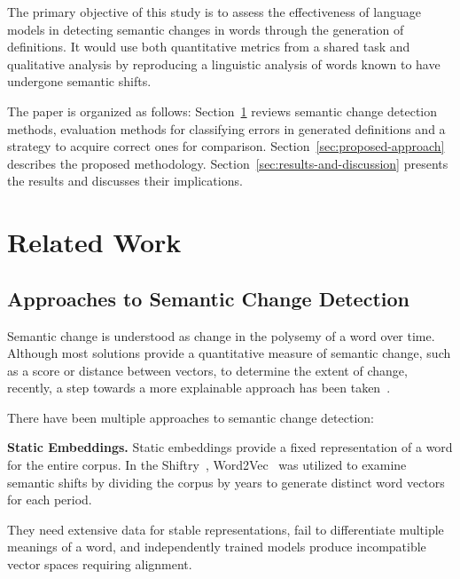 \documentclass[11pt]{article}
\begin{document}
The primary objective of this study is to assess the effectiveness of language models in detecting semantic changes in words through the generation of definitions.
It would use both quantitative metrics from a shared task and qualitative analysis by reproducing a linguistic analysis of words known to have undergone semantic shifts.

The paper is organized as follows:
Section~\ref{sec:related-work} reviews semantic change detection methods, evaluation methods for classifying errors in generated definitions and a strategy to acquire correct ones for comparison.
Section~\ref{sec:proposed-approach} describes the proposed methodology.
Section~\ref{sec:results-and-discussion} presents the results and discusses their implications.

\section{Related Work}\label{sec:related-work}

\subsection{Approaches to Semantic Change Detection}

Semantic change is understood as change in the polysemy of a word over time.
Although most solutions provide a quantitative measure of semantic change, such as a score or distance between vectors,
to determine the extent of change, recently, a step towards a more explainable approach has been taken~\cite{DefinitionGenerationMainArticle,fedorova-etal-2024-definition}.

There have been multiple approaches to semantic change detection:

\textbf{Static Embeddings.}
Static embeddings provide a fixed representation of a word for the entire corpus.
In the Shiftry~\cite{shiftry}, Word2Vec~\cite{Word2VecOriginal} was utilized to examine semantic shifts by dividing the corpus by years to generate distinct word vectors for each period.

They need extensive data for stable representations, fail to differentiate multiple meanings of a word,
and independently trained models produce incompatible vector spaces requiring alignment.
\end{document}
